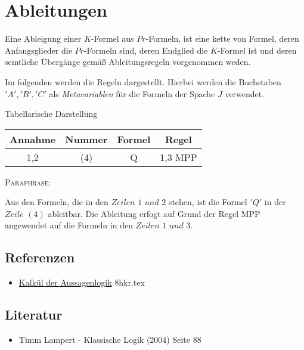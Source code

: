 \documentclass{sajzk}
\begin{document}
\section{Ableitungen} 
\label{3u33}

Eine Ableigung einer $K$-Formel aus $Pr$-Formeln, ist eine kette von Formel,
deren Anfangsglieder die $Pr$-Formeln sind, deren Endglied die $K$-Formel ist
und deren semtliche Übergänge gemäß Ableitungsregeln vorgenommen weden.

Im folgenden werden die Regeln dargestellt. Hierbei werden die Buchstaben
$'A', 'B', 'C'$ als \textit{Metavariablen} für die Formeln der Spache $J$
verwendet.

Tabellarische Darstellung
\begin{center}
\begin{tabular}{|c|c|c|c|}
  \hline
  Annahme & Nummer & Formel & Regel \\
  \hline
  1,2     & (4)    & Q      & 1,3 MPP \\
  \hline
\end{tabular}
\end{center}

\textsc{Paraphrase:}

Aus den Formeln, die in den $Zeilen$ $1$ $und$ $2$ stehen, ist die Formel
$'Q'$ in der $Zeile$ $(4)$ ableitbar. Die Ableitung erfogt auf Grund der Regel
MPP angewendet auf die Formeln in den $Zeilen$ $1$ $und$ $3$.
\subsection{Referenzen} 

\begin{itemize}
    \item \href{8hkr.pdf}{Kalkül der Aussagenlogik} 8hkr.tex
\end{itemize}

\subsection{Literatur} 

\begin{itemize}
  \item Timm Lampert - Klassische Logik (2004) Seite 88
\end{itemize}
\end{document}
